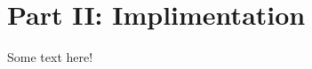 \documentclass[a4paper, 12pt]{article}
\title{}
\begin{document}

\section{Part II: Implimentation} \label{sec:intro}
Some text here!
\end{document}
